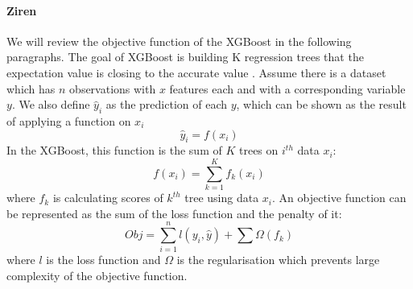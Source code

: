 \documentclass[runningheads]{llncs}
\begin{document}
\paragraph{Ziren}We will review the objective function of the XGBoost in the following paragraphs. The goal of XGBoost is building K regression trees that the expectation value is closing to the accurate value \citep{chen2016xgboost}. Assume there is a dataset which has $n$ observations with $x$ features each and with a corresponding variable $y$. We also define $\hat{y}_i$ as the prediction of each $y$, which can be shown as the result of applying a function on $x_i$
\begin{equation}
    \hat{y}_i = f(x_i)
\end{equation}
In the XGBoost, this function is the sum of $K$ trees on $i^{th}$ data $x_i$:
\begin{equation}
    f(x_i) = \sum^K_{k=1} f_k(x_i)
\end{equation}
where $f_k$ is calculating scores of $k^{th}$ tree using data $x_i$. An objective function can be represented as the sum of the loss function and the penalty of it:
\begin{equation}
    Obj = \sum^n_{i=1}l(y_i, \hat{y}) + \sum \Omega(f_k)
\end{equation}
where $l$ is the loss function and $\Omega$ is the regularisation which prevents large complexity of the objective function. 
\end{document}
